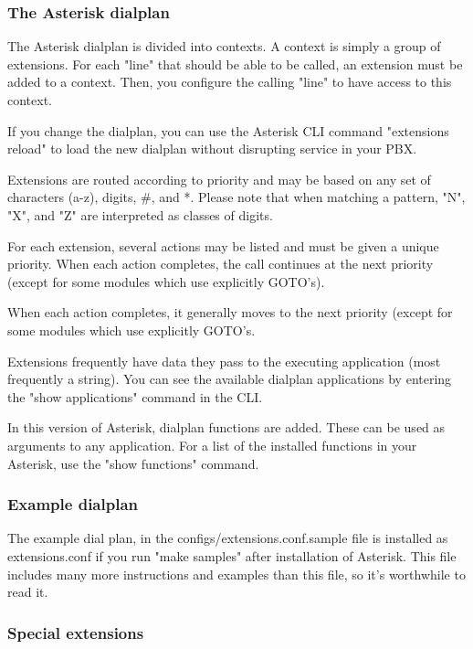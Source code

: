 \subsubsection{The Asterisk dialplan}

The Asterisk dialplan is divided into contexts. A context is simply a group
of extensions. For each "line" that should be able to be called, an extension
must be added to a context. Then, you configure the calling "line" to have
access to this context.

If you change the dialplan, you can use the Asterisk CLI command
"extensions reload" to load the new dialplan without disrupting
service in your PBX.

Extensions are routed according to priority and may be based on any set
of characters (a-z), digits, \#, and *. Please note that when matching a
pattern, "N", "X", and "Z" are interpreted as classes of digits.

For each extension, several actions may be listed and must be given a unique
priority. When each action completes, the call continues at the next priority
(except for some modules which use explicitly GOTO's). 

When each action completes, it generally moves to the next priority (except for
some modules which use explicitly GOTO's. 

Extensions frequently have data they pass to the executing application
(most frequently a string).  You can see the available dialplan applications
by entering the "show applications" command in the CLI.

In this version of Asterisk, dialplan functions are added. These can
be used as arguments to any application. For a list of the installed
functions in your Asterisk, use the "show functions" command.

\subsubsection{Example dialplan}

The example dial plan, in the configs/extensions.conf.sample file
is installed as extensions.conf if you run "make samples" after
installation of Asterisk. This file includes many more instructions
and examples than this file, so it's worthwhile to read it.
	
\subsubsection{Special extensions}

